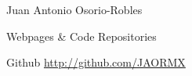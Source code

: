 \documentclass[spanish,10pt,letterpaper]{article}
\begin{document}
\begin{cv}{Juan Antonio Osorio-Robles}
	\begin{cvlist}{Webpages \& Code Repositories}
		\item [Github] \href{http://github.com/JAORMX}{http://github.com/JAORMX}
	\end{cvlist}

\end{cv}
\end{document}
